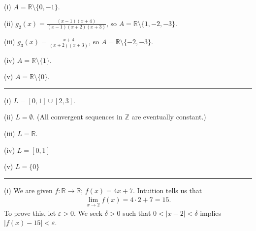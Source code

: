 \documentclass[letterpaper,10pt,english]{jupyterBook}
\begin{document}
\sphinxAtStartPar
(i) \(A=\mathbb{R} \setminus \{0, -1\}\).

\sphinxAtStartPar
(ii) \(g_{2}(x) = \displaystyle\frac{(x-1)(x+4)}{(x-1)(x+2)(x+3)}\), so \(A=\mathbb{R} \setminus \{1, -2, -3\}\).

\sphinxAtStartPar
(iii) \(g_{3}(x) = \displaystyle\frac{x+4}{(x+2)(x+3)}\), so \(A=\mathbb{R} \setminus \{-2, -3\}\).

\sphinxAtStartPar
(iv) \(A=\mathbb{R} \setminus \{1\}\).

\sphinxAtStartPar
(v) \(A=\mathbb{R} \setminus \{0\}\).


\bigskip\hrule\bigskip


\sphinxAtStartPar
{\hyperref[\detokenize{Problems:id2}]{}} 

\sphinxAtStartPar
(i) \(L=[0,1]\cup[2,3]\).

\sphinxAtStartPar
(ii) \(L=\emptyset\).  (All convergent sequences in \(\mathbb{Z}\) are eventually constant.)

\sphinxAtStartPar
(iii) \(L=\mathbb{R}\).

\sphinxAtStartPar
(iv) \(L=[0,1]\)

\sphinxAtStartPar
(v) \(L=\{0\}\)


\bigskip\hrule\bigskip


\sphinxAtStartPar
{\hyperref[\detokenize{Problems:id3}]{}} 

\sphinxAtStartPar
(i) We are given \(f:\mathbb{R}\to\mathbb{R}\); \(f(x)=4x+7\). Intuition tells us that
\begin{equation*}
\begin{split}
\lim_{x\rightarrow 2}f(x) = 4\cdot 2+7 = 15.
\end{split}
\end{equation*}
\sphinxAtStartPar
To prove this, let \(\varepsilon>0\). We seek \(\delta>0\) such that \(0<|x-2|<\delta\) implies \(|f(x)-15|<\varepsilon\).
\end{document}
